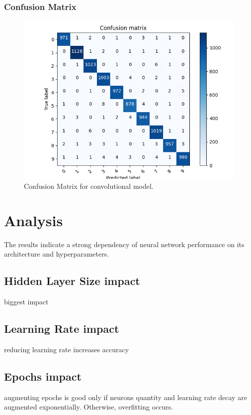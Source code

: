 \documentclass[utf8,1pt]{extarticle} %
\begin{document}
\subsubsection{Confusion Matrix}
\begin{figure}
    \centering
    \includegraphics[width=\textwidth]{media/convolution/Figure_1.png}
    \caption{Confusion Matrix for convolutional model.}
    \label{fig:convolution_confusion}
\end{figure}

\section{Analysis}
The results indicate a strong dependency of 
neural network performance on its 
architecture and 
hyperparameters. 
\subsection{Hidden Layer Size impact}
biggest impact
\subsection{Learning Rate impact}
reducing learning rate increases accuracy
\subsection{Epochs impact}
augmenting epochs is good only if neurons quantity and learning rate decay are augmented exponentially.
Otherwise, overfitting occurs.
\end{document}

